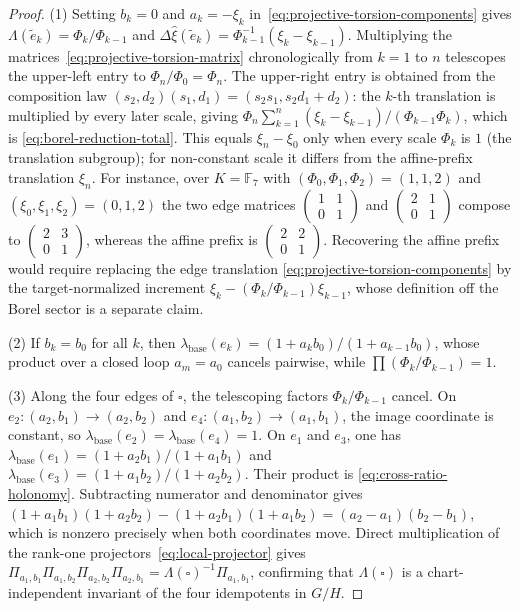 \begin{proof}
(1) Setting $b_k=0$ and $a_k=-\xi_k$ in~\eqref{eq:projective-torsion-components}
gives $\Lambda(\tilde{e}_k)=\Phi_k/\Phi_{k-1}$ and
$\Delta\hat{\xi}(\tilde{e}_k)=\Phi_{k-1}^{-1}(\xi_k-\xi_{k-1})$. Multiplying the
matrices~\eqref{eq:projective-torsion-matrix} chronologically from $k=1$ to $n$
telescopes the upper-left entry to $\Phi_n/\Phi_0=\Phi_n$.  The upper-right entry
is obtained from the composition law
$(s_2,d_2)(s_1,d_1)=(s_2s_1,s_2d_1+d_2)$: the $k$-th translation is multiplied
by every later scale, giving
$\Phi_n\sum_{k=1}^n(\xi_k-\xi_{k-1})/(\Phi_{k-1}\Phi_k)$, which is
\eqref{eq:borel-reduction-total}.  This equals $\xi_n-\xi_0$ only when every
scale $\Phi_k$ is $1$ (the translation subgroup); for non-constant scale it
differs from the affine-prefix translation $\xi_n$.  For instance, over
$K=\mathbb F_7$ with $(\Phi_0,\Phi_1,\Phi_2)=(1,1,2)$ and
$(\xi_0,\xi_1,\xi_2)=(0,1,2)$ the two edge matrices
$\begin{pmatrix}1&1\\0&1\end{pmatrix}$ and $\begin{pmatrix}2&1\\0&1\end{pmatrix}$
compose to $\begin{pmatrix}2&3\\0&1\end{pmatrix}$, whereas the affine prefix is
$\begin{pmatrix}2&2\\0&1\end{pmatrix}$.  Recovering the affine prefix would
require replacing the edge translation \eqref{eq:projective-torsion-components}
by the target-normalized increment $\xi_k-(\Phi_k/\Phi_{k-1})\xi_{k-1}$, whose
definition off the Borel sector is a separate claim.

(2) If $b_k=b_0$ for all $k$, then $\lambda_{\mathrm{base}}(e_k)=(1+a_k b_0)/(1+a_{k-1}b_0)$,
whose product over a closed loop $a_m=a_0$ cancels pairwise, while $\prod (\Phi_k/\Phi_{k-1})=1$.

(3) Along the four edges of $\square$, the telescoping factors $\Phi_k/\Phi_{k-1}$
cancel. On $e_2: (a_2,b_1)\to(a_2,b_2)$ and $e_4: (a_1,b_2)\to(a_1,b_1)$, the image
coordinate is constant, so $\lambda_{\mathrm{base}}(e_2)=\lambda_{\mathrm{base}}(e_4)=1$.
On $e_1$ and $e_3$, one has $\lambda_{\mathrm{base}}(e_1)=(1+a_2 b_1)/(1+a_1 b_1)$
and $\lambda_{\mathrm{base}}(e_3)=(1+a_1 b_2)/(1+a_2 b_2)$. Their product is
\eqref{eq:cross-ratio-holonomy}. Subtracting numerator and denominator gives
$(1+a_1 b_1)(1+a_2 b_2) - (1+a_2 b_1)(1+a_1 b_2) = (a_2-a_1)(b_2-b_1)$, which is
nonzero precisely when both coordinates move. Direct multiplication of the rank-one
projectors~\eqref{eq:local-projector} gives
$\Pi_{a_1,b_1}\Pi_{a_1,b_2}\Pi_{a_2,b_2}\Pi_{a_2,b_1} = \Lambda(\square)^{-1}\Pi_{a_1,b_1}$,
confirming that $\Lambda(\square)$ is a chart-independent invariant of the four
idempotents in $G/H$.
\end{proof}

